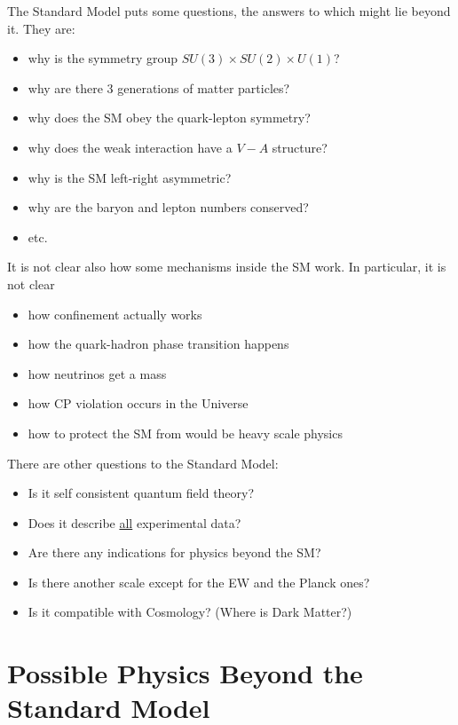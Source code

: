 \documentclass{cernyrep}
\begin{document}
The Standard Model puts some questions, the answers to which might lie beyond it. They are:
\begin{itemize}
\item why is the symmetry group $SU(3)\times SU(2)\times U(1)$?
\item why are there 3 generations of matter particles?
\item why does the SM obey the quark-lepton symmetry?
\item why does the weak interaction have a $V-A$ structure?
\item why is the SM left-right asymmetric?
\item why are the baryon and lepton numbers conserved?
\item etc.
\end{itemize}
It is not clear also how some mechanisms inside the SM work. In particular, it is not clear
\begin{itemize}
\item how confinement actually works
\item how the quark-hadron phase transition happens
\item how neutrinos get a mass
\item how CP violation occurs in the Universe
\item how to protect the SM from would be heavy scale  physics
\end{itemize}
There are other questions to the Standard Model:
\begin{itemize}
\item Is it self consistent quantum field theory?
\item Does it describe \underline{all} experimental data?
\item  Are there any indications for physics beyond the SM?
\item Is there another scale except for the EW and the Planck ones?
\item  Is it compatible with Cosmology? (Where is Dark Matter?)
\end{itemize}

\section{Possible Physics Beyond the Standard Model}
\end{document}
